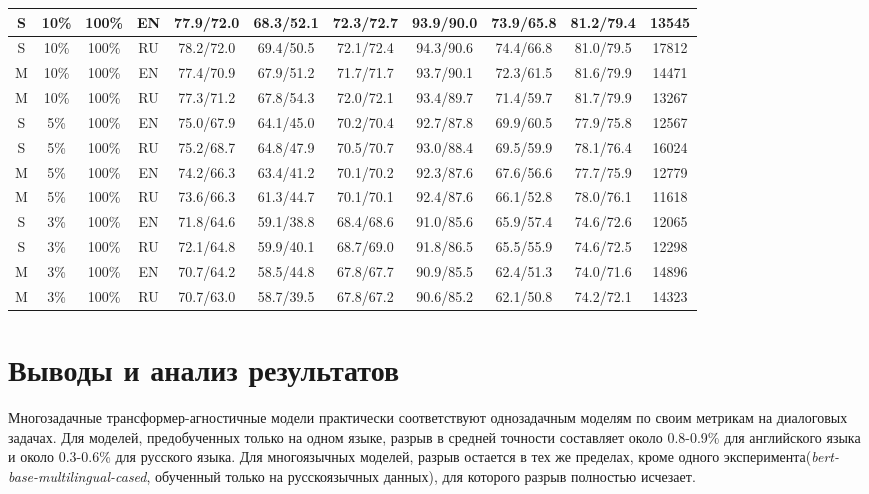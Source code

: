 \begin{table*}
{\begin{tabular}{|c|c|c|c||c|c|c|c|c|c||c|}
 S & 10\% & 100\% & EN & 77.9/72.0 & 68.3/52.1 & 72.3/72.7 & 93.9/90.0 & 73.9/65.8 & 81.2/79.4 & 13545 \\ \hline
 S & 10\% & 100\% & RU & 78.2/72.0 & 69.4/50.5 & 72.1/72.4 & 94.3/90.6 & 74.4/66.8 & 81.0/79.5 & 17812 \\ \hline 
M & 10\% & 100\% & EN & 77.4/70.9 & 67.9/51.2 & 71.7/71.7 & 93.7/90.1 & 72.3/61.5 & 81.6/79.9 & 14471 \\ \hline 
M & 10\% & 100\% & RU & 77.3/71.2 & 67.8/54.3 & 72.0/72.1 & 93.4/89.7 & 71.4/59.7 & 81.7/79.9 & 13267 \\ \hline
 S & 5\% & 100\% & EN & 75.0/67.9 & 64.1/45.0 & 70.2/70.4 & 92.7/87.8 & 69.9/60.5 & 77.9/75.8 & 12567 \\ \hline 
S & 5\% & 100\% & RU & 75.2/68.7 & 64.8/47.9 & 70.5/70.7 & 93.0/88.4 & 69.5/59.9 & 78.1/76.4 & 16024 \\ \hline 
M & 5\% & 100\% & EN & 74.2/66.3 & 63.4/41.2 & 70.1/70.2 & 92.3/87.6 & 67.6/56.6 & 77.7/75.9 & 12779 \\ \hline 
M & 5\% & 100\% & RU & 73.6/66.3 & 61.3/44.7 & 70.1/70.1 & 92.4/87.6 & 66.1/52.8 & 78.0/76.1 & 11618 \\ \hline
 S & 3\% & 100\% & EN & 71.8/64.6 & 59.1/38.8 & 68.4/68.6 & 91.0/85.6 & 65.9/57.4 & 74.6/72.6 & 12065 \\ \hline
 S & 3\% & 100\% & RU & 72.1/64.8 & 59.9/40.1 & 68.7/69.0 & 91.8/86.5 & 65.5/55.9 & 74.6/72.5 & 12298 \\ \hline
 M & 3\% & 100\% & EN & 70.7/64.2 & 58.5/44.8 & 67.8/67.7 & 90.9/85.5 & 62.4/51.3 & 74.0/71.6 & 14896 \\ \hline 
M & 3\% & 100\% & RU & 70.7/63.0 & 58.7/39.5 & 67.8/67.2 & 90.6/85.2 & 62.1/50.8 & 74.2/72.1 & 14323 \\ \hline \end{tabular} } \end{table*} 


\section{Выводы и анализ результатов}\label{ch:tr-ag:discussion_conclusion}
Многозадачные трансформер-агностичные модели практически соответствуют однозадачным моделям по своим метрикам на диалоговых задачах. Для моделей, предобученных только на одном языке, разрыв в средней точности составляет около 0.8-0.9\% для английского языка и около 0.3-0.6\% для русского языка. Для многоязычных моделей, разрыв остается в тех же пределах, кроме одного эксперимента(\textit{bert-base-multilingual-cased}, обученный только на русскоязычных данных), для которого разрыв полностью исчезает.

